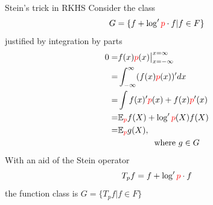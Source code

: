 \begin{frame}
\begin{columns}
\begin{column}{.33\linewidth}
\begin{block}{Stein's trick in RKHS}
Consider the  class \large
$$G = \{ f  +  \log' { \color{red} p} \cdot  f | f \in F \}$$
\normalsize
justified by integration by parts
\begin{align*}
 0= &  f(x) {\color{red} p}(x)  \big|_{x=-\infty}^{x=\infty} \\
   = &  \int_{-\infty}^{\infty} (f(x) {\color{red} p}(x) )'  dx \\
   = &  \int   f(x)' { \color{red} p}(x)   + f(x){\color{red} p}'(x)  \\
   = &  \mathbb{E}_{\color{red} p} f(X)  +  \log' {\color{red} p}(X) f(X) \\
   = & \mathbb{E}_{\color{red} p} g(X), \\
    & \quad \quad \quad  \quad  \text{ where } g \in G
\end{align*}
With an aid of the Stein operator 
\[
 T_{p}f =  f  +  \log' { \color{red} p} \cdot  f
\]
the function class is $G = \{ T_{p}f | f \in F \}$
\end{block}
\vspace{-0.75cm}


\end{column}
\end{columns}
\end{frame}
